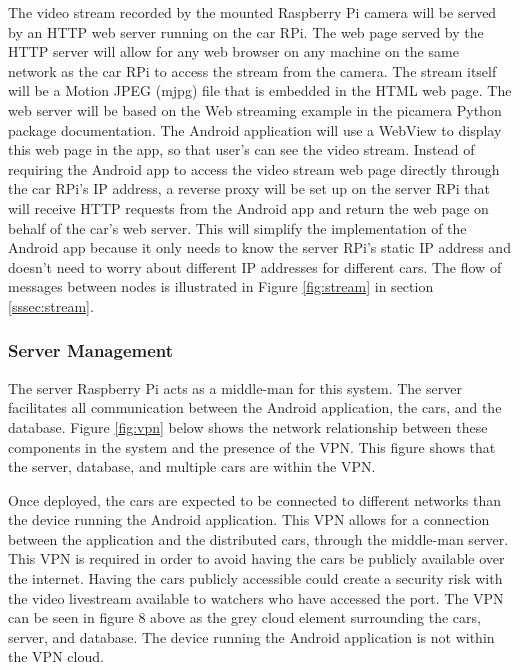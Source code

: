 \documentclass[letterpaper,12pt]{report}
\begin{document}
    The video stream recorded by the mounted Raspberry Pi camera will be
    served by an HTTP web server running on the car RPi. The web page served
    by the HTTP server will allow for any web browser on any machine on the
    same network as the car RPi to access the stream from the camera. The
    stream itself will be a Motion JPEG (mjpg) file that is embedded in the
    HTML web page. The web server will be based on the Web streaming example
    \cite{advancedrecipes} in the picamera Python package documentation. The
    Android application will use a WebView \cite{webbased} to display this
    web page in the app, so that user’s can see the video stream. Instead of
    requiring the Android app to access the video stream web page directly
    through the car RPi's IP address, a reverse proxy will be set up on the
    server RPi that will receive HTTP requests from the Android app and
    return the web page on behalf of the car's web server. This will simplify
    the implementation of the Android app because it only needs to know the
    server RPi's static IP address and doesn't need to worry about different
    IP addresses for different cars. The flow of messages between nodes is
    illustrated in Figure \ref{fig:stream} in section \ref{sssec:stream}.

    \subsubsection{Server Management}

    The server Raspberry Pi acts as a middle-man for this system. The server
    facilitates all communication between the Android application, the cars,
    and the database. Figure \ref{fig:vpn} below shows the network relationship between
    these components in the system and the presence of the VPN. This figure
    shows that the server, database, and multiple cars are within the VPN.

    Once deployed, the cars are expected to be connected to different
    networks than the device running the Android application. This VPN allows
    for a connection between the application and the distributed cars,
    through the middle-man server. This VPN is required in order to avoid
    having the cars be publicly available over the internet. Having the
    cars publicly accessible could create a security risk with the video
    livestream available to watchers who have accessed the port. The VPN can
    be seen in figure 8 above as the grey cloud element surrounding the cars,
    server, and database. The device running the Android application is not
    within the VPN cloud.
\end{document}
